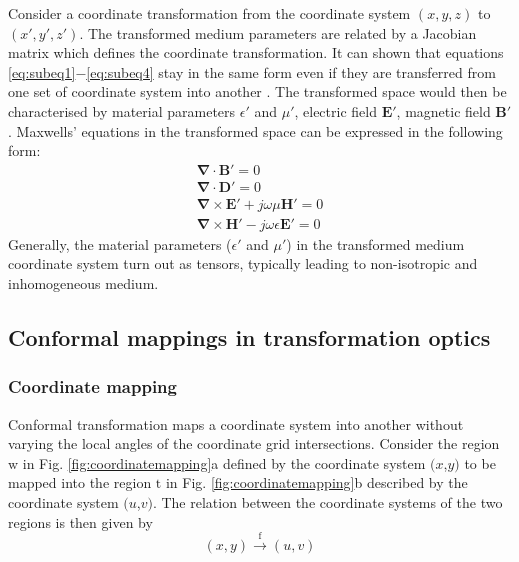 Consider a coordinate transformation from the coordinate system ${(x,y,z)}$ to ${(x', y', z')}$. The transformed medium parameters are related by a Jacobian matrix which defines the coordinate transformation. It can shown that  equations \ref{eq:subeq1}$-$\ref{eq:subeq4} stay in the same form even if they are transferred from one set of coordinate system into another \cite{ozgun2010}. The transformed space would then be characterised by material parameters $\epsilon'$ and $\mu'$, electric field $\textbf{E}'$, magnetic field $\textbf{B}'$. Maxwells' equations in the transformed space can be expressed in the following form:
%
\begin{subequations}
	\begin{align}
		\mathbf{\nabla} \cdot \mathbf{B'}    = 0 \label{eq:subeq11}\\ 
		\mathbf{\nabla} \cdot \mathbf{D'}    = 0 \label{eq:subeq12}\\
		\mathbf{\nabla} \times \mathbf{E'} + j \omega \mu \mathbf{H'} = 0 \label{eq:subeq13}\\
		\mathbf{\nabla} \times \mathbf{H'} - j \omega \epsilon \mathbf{E'} = 0 \label{eq:subeq14}
	\end{align} 
\end{subequations}
%
Generally, the  material parameters ($\epsilon'$ and $\mu'$)  in the transformed medium coordinate system turn out as tensors, typically leading to non-isotropic and inhomogeneous medium. %
\subsection{Conformal mappings in transformation optics}
\subsubsection{Coordinate mapping}
Conformal transformation maps a coordinate system into another without varying the local angles of the coordinate grid intersections. Consider the region $\mathrm{w}$ in Fig. \ref{fig:coordinatemapping}a defined by the coordinate system $(x$,$y)$ to be mapped into the region $\mathrm{t}$ in Fig. \ref{fig:coordinatemapping}b described by the coordinate system  $(u$,$v)$. The relation between the coordinate systems of the two regions is then given by 
\begin{equation} \label{eq:transformationrelation}
	(x,y) \overset{\mathrm{f}}{\longrightarrow} (u,v) 
\end{equation}


